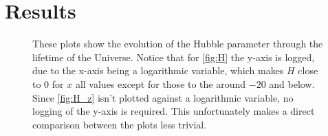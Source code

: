 \documentclass[a4paper,norsk, 10pt]{article}
\begin{document}
\newpage

\section{Results}


\begin{figure}[ht]
     \centering
     \caption{These plots show the evolution of the Hubble parameter through the lifetime of the Universe. Notice that for \ref{fig:H} the y-axis is logged, due to the x-axis being a logarithmic variable, which makes $H$ close to $0$ for $x$ all values except for those to the around $-20$ and below. Since \ref{fig:H_z} isn't plotted against a logarithmic variable, no logging of the y-axis is required. This unfortunately makes a direct comparison between the plots less trivial.}
     \label{fig:Hs}
\end{figure}
\end{document}
